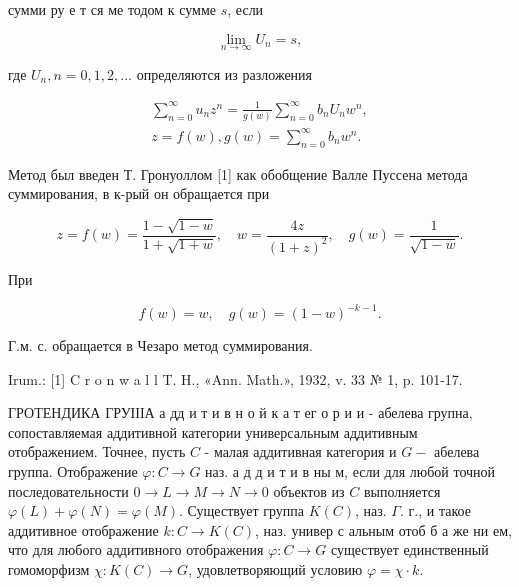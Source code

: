 \documentclass[10pt]{article}
\begin{document}
сумми ру е т ся ме тодом к сумме $s$, если



\[

\lim _{n \rightarrow \infty} U_{n}=s,

\]



где $U_{n}, n=0,1,2, \ldots$ определяются из разложения



\[

\begin{gathered}

\sum_{n=0}^{\infty} u_{n} z^{n}=\frac{1}{g(w)} \sum_{n=0}^{\infty} b_{n} U_{n} w^{n}, \\

z=f(w), g(w)=\sum_{n=0}^{\infty} b_{n} w^{n} .

\end{gathered}

\]



Метод был введен Т. Гронуоллом [1] как обобщение Валле Пуссена метода суммирования, в к-рый он обращается при



\[

z=f(w)=\frac{1-\sqrt{1-w}}{1+\sqrt{1+w}}, \quad w=\frac{4 z}{(1+z)^{2}}, \quad g(w)=\frac{1}{\sqrt{1-w}} .

\]



При



\[

f(w)=w, \quad g(w)=(1-w)^{-k-1} .

\]



Г.м. с. обращается в Чезаро метод суммирования.



Irum.: [1] C r o n w a l l T. H., «Ann. Math.», 1932, v. 33 № 1, p. 101-17.



ГРОТЕНДИКА ГРУІІІА а дд и т и в н $о$ й к а т ег о р и и - абелева групна, сопоставляемая аддитивной категории универсальным аддитивным отображением. Точнее, пусть $C$ - малая аддитивная категория и $G-$ абелева группа. Отображение $\varphi: C \rightarrow G$ наз. а д д и т и в ны м, если для любой точной последовательности $0 \rightarrow L \rightarrow M \rightarrow N \rightarrow 0$ объектов из $C$ выполняется $\varphi(L)+\varphi(N)=\varphi(M)$. Существует группа $K(C)$, наз. $\Gamma$. г., и такое аддитивное отображение $k: C \rightarrow K(C)$, наз. универ с альным отоб б а же ни ем, что для любого аддитивного отображения $\varphi: C \rightarrow G$ существует единственный гомоморфизм $\chi: K(C) \rightarrow G$, удовлетворяющий условию $\varphi=\chi \cdot k$.
\end{document}
